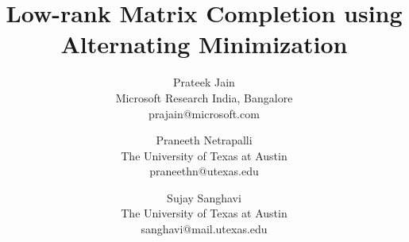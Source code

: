 \documentclass[11pt]{article}
\theoremstyle{plain}
\theoremstyle{definition}
\begin{document}
\title{ Low-rank Matrix Completion using Alternating Minimization}
%
%
%
%
%
%
\author{
%
%
Prateek Jain\\
{Microsoft Research India, Bangalore}\\
{prajain@microsoft.com}
\and
Praneeth Netrapalli\\
{The University of Texas at Austin}\\
{praneethn@utexas.edu}
\and
Sujay Sanghavi\\
{The University of Texas at Austin}\\
{sanghavi@mail.utexas.edu}
}
\end{document}
